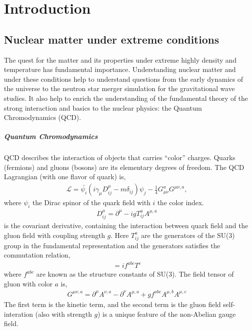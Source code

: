 \chapter{Introduction}
\label{chapter:introduction}
\section{Nuclear matter under extreme conditions}
The quest for the matter and its properties under extreme highly density and temperature has fundamental importance.
Understanding nuclear matter and under these conditions help to understand questions from the early dynamics of the universe to the neutron star merger simulation for the gravitational wave studies.
It also help to enrich the understanding of the fundamental theory of the strong interaction and basics to the nuclear physics: the Quantum Chromodynamics (QCD).

\paragraph{Quantum Chromodynamics}
QCD describes the interaction of objects that carries ``color'' charges.
Quarks (fermions) and gluons (bosons) are its elementary degrees of freedom. 
The QCD Lagrangian (with one flavor of quark) is,
\begin{eqnarray}
\mathcal{L} = \bar{\psi_i} \left(i\gamma_\mu D^\mu_{ij} -m \delta_{ij} \right)\psi_j - \frac{1}{4}G_{\mu\nu}^a G^{\mu\nu,a},
\end{eqnarray}
where $\psi_i$ the Dirac spinor of the quark field with $i$ the color index.
\begin{eqnarray}
D_{ij}^\mu = \partial^\mu - i g T_{ij}^a A^{\mu, a}
\end{eqnarray}
is the covariant derivative, containing the interaction between quark field and the gluon field with coupling strength $g$.
Here $T_{ij}^a$ are the generators of the SU(3) group in the fundamental representation and the generators satisfies the commutation relation,
\begin{eqnarray}
[T^a, T^b] = i f^{abc} T^c
\end{eqnarray}
where $f^{abc}$ are known as the structure constants of SU(3).
The field tensor of gluon with color $a$ is,
\begin{eqnarray}
G^{\mu\nu,a} = \partial^\mu A^{\nu, a} - \partial^\nu A^{\mu, a} + g f^{abc} A^{\mu,b}A^{\mu,c}
\end{eqnarray}
The first term is the kinetic term, and the second term is the gluon field self-interation (also with strength $g$) is a unique feature of the non-Abelian gauge field.

